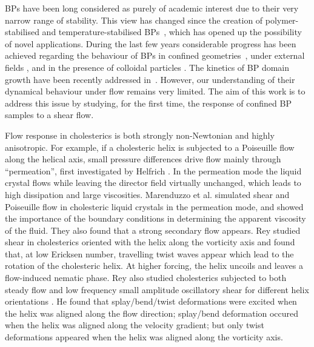 \documentclass[12pt,twoside]{iopart}
\begin{document}
BPs have been long considered as purely of academic interest due to their very narrow range of stability. This view has changed since the creation of
polymer-stabilised and temperature-stabilised BPs~\cite{Kikuchi:2002,Coles:2005}, which has opened up the possibility of novel applications.
During the last few years considerable progress has been achieved regarding the behaviour of BPs in confined geometries~\cite{Fukuda:2010a, Fukuda:2010b, Ravnik:2011b}, under external fields \cite{Alexander:2008,Fukuda:2009,Henrich:2010a,Castles:2010,Tiribocchi:2011}, and in the presence of colloidal particles \cite{Ravnik:2011a}. 
The kinetics of BP domain growth have been recently addressed in~\cite{Henrich:2010b}. However, our understanding of their dynamical behaviour under flow remains
very limited. The aim of this work is to address this issue by studying,
for the first time, the response of confined BP samples to a shear flow.

Flow response in cholesterics is both strongly non-Newtonian and highly anisotropic.
For example, if a cholesteric helix is subjected to a Poiseuille flow along
the helical axis, small pressure differences drive flow mainly through
``permeation'', first investigated by Helfrich \cite{Helfrich:1969}.
In the permeation mode the liquid crystal flows while leaving the director
field virtually unchanged, which leads to high dissipation and large
viscosities. Marenduzzo et al. \cite{Marenduzzo:2006a,Marenduzzo:2006b} simulated shear and Poiseuille flow in cholesteric liquid crystals in the permeation mode, and showed the importance of the boundary conditions in determining the apparent viscosity of the fluid. They also found that a strong secondary flow appears.
Rey \cite{Rey:1996a, Rey:1996b} studied shear in cholesterics oriented with the helix along the vorticity axis and found that, at low Ericksen number, travelling twist waves appear which lead to the rotation of the cholesteric helix. At higher forcing, the helix uncoils and leaves a flow-induced nematic phase. 
Rey also studied cholesterics subjected to both steady flow and low frequency
small amplitude oscillatory shear for different helix orientations
\cite{Rey:2000, Rey:2002}. He found that splay/bend/twist deformations were
excited when the helix was aligned along the flow direction; splay/bend
deformation occured when the helix was aligned along the velocity gradient;
but only twist deformations
appeared when the helix was aligned along the vorticity axis.
\end{document}
